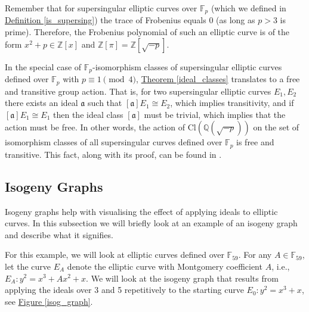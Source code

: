 \documentclass[openany, a4paper, 10pt]{book}
\theoremstyle{plain}
\theoremstyle{plain}
\theoremstyle{plain}
\theoremstyle{definition}
\theoremstyle{plain}
\theoremstyle{definition}
\theoremstyle{remark}
\newcommand{\figref}[1]{\hyperref[#1]{Figure \ref{#1}}}
\newcommand{\defref}[1]{\hyperref[#1]{Definition \ref{#1}}}
\newcommand{\theoref}[1]{\hyperref[#1]{Theorem \ref{#1}}}
\begin{document}
Remember that for supersingular elliptic curves over $\mathbb F_p$ (which we defined in \defref{is_supersing}) the trace of Frobenius equals $0$ (as long as $p>3$ is prime).
Therefore, the Frobenius polynomial of such an elliptic curve is of the form $x^2+p\in\mathbb Z[x]$ and $\mathbb Z[\pi] = \mathbb Z[\sqrt{-p}]$.

In the special case of $\mathbb F_p$-isomorphism classes of supersingular elliptic curves defined over $\mathbb F_p$ with $p \equiv 1 \pmod 4$, \theoref{ideal_classes} translates to a free and transitive \cite[Definitions~3.6,3.8]{free_transitive} group action.
That is, for two supersingular elliptic curves $E_1, E_2$ there exists an ideal $\mathfrak a$ such that $[\mathfrak a]E_1\cong E_2$, which implies transitivity, and if $[\mathfrak a]E_1 \cong E_1$ then the ideal class $[\mathfrak a]$ must be trivial, which implies that the action must be free.
In other words, the action of $\mathrm{Cl}(\mathbb Q(\sqrt{-p}))$ on the set of isomorphism classes of all supersingular curves defined over $\mathbb F_p$ is free and transitive.
This fact, along with its proof, can be found in \cite[Theorem~7]{CSIDH}.


\subsection{Isogeny Graphs}\label{sec:isog_graphs}
Isogeny graphs help with visualising the effect of applying ideals to elliptic curves.
In this subsection we will briefly look at an example of an isogeny graph and describe what it signifies.

For this example, we will look at elliptic curves defined over $\mathbb F_{59}$.
For any $A \in \mathbb F_{59}$, let the curve $E_A$ denote the elliptic curve with Montgomery coefficient $A$, i.e., $E_A: y^2 = x^3 + Ax^2 + x$.
We will look at the isogeny graph that results from applying the ideals over 3 and 5 repetitively to the starting curve $E_0: y^2 = x^3 + x$, see \figref{isog_graph}.
\end{document}
